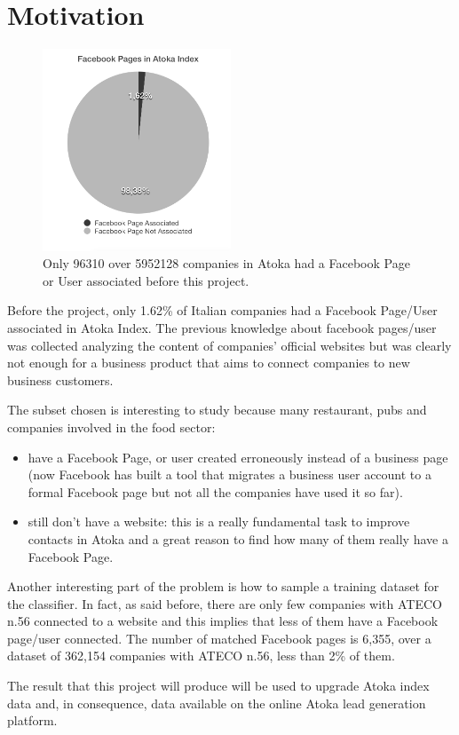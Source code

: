 \chapter{Motivation} 

\begin{figure}
\centering
\includegraphics[width=0.5\textwidth]{img/facebook_atoka_bw.png}
\caption{Only 96310 over 5952128 companies in Atoka had a Facebook Page or User associated before this project.}
\label{Fig.1}
\end{figure}


Before the project, only 1.62\% of Italian companies had a Facebook Page/User associated in Atoka Index. The previous knowledge about facebook pages/user was collected analyzing the content of companies' official websites but was clearly not enough for a business product that aims to connect companies to new business customers.

The subset chosen is interesting to study because many restaurant, pubs and companies involved in the food sector:

\begin{itemize}
\item have a Facebook Page, or user created erroneously instead of a business page (now Facebook has built a tool that migrates a business user account to a formal Facebook page but not all the companies have used it so far).
\item still don't have a website: this is a really fundamental task to improve contacts in Atoka and a great reason to find how many of them really have a Facebook Page.
\end{itemize}

Another interesting part of the problem is how to sample a training dataset for the classifier. In fact, as said before, there are only few companies with ATECO n.56 connected to a website and this implies that less of them have a Facebook page/user connected. The number of matched Facebook pages is 6,355, over a dataset of 362,154 companies with ATECO n.56, less than 2\% of them.

The result that this project will produce will be used to upgrade Atoka index data and, in consequence, data available on the online Atoka lead generation platform.


